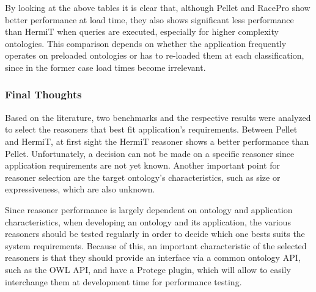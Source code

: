 By looking at the above tables it is clear that, although Pellet and RacePro show better performance at load time, they also shows significant less performance than HermiT when queries are executed, especially for higher complexity ontologies. This comparison depends on whether the application frequently operates on preloaded ontologies or has to re-loaded them at each classification, since in the former case load times become irrelevant. 


\subsubsection{Final Thoughts}

Based on the literature, two benchmarks and the respective results were analyzed to select the reasoners that best fit application's requirements. Between Pellet and HermiT, at first sight the HermiT reasoner shows a better performance than Pellet.  Unfortunately, a decision can not be made on a specific reasoner since application requirements are not yet known. Another important point for reasoner selection are the target ontology's characteristics, such as size or expressiveness, which are also unknown. 

Since reasoner performance is largely dependent on ontology and application characteristics, when developing an ontology and its application, the various reasoners should be tested regularly in order to decide which one bests suits the system requirements. Because of this, an important characteristic of the selected reasoners is that they should provide an interface via a common ontology API, such as the OWL API, and have a Protege plugin, which will allow to easily interchange them at development time for performance testing. 

